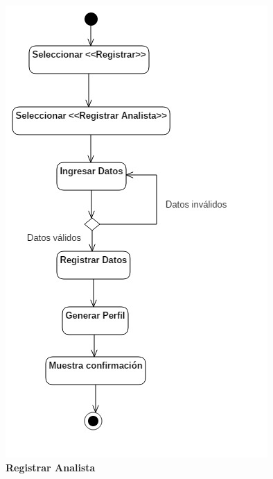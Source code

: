 \begin{figure}[H]
  \centering
    \includegraphics[scale=.8,angle=0]{project/Actividades/Analista.jpg}
  \caption{\textbf{Registrar Analista}}
\end{figure}
